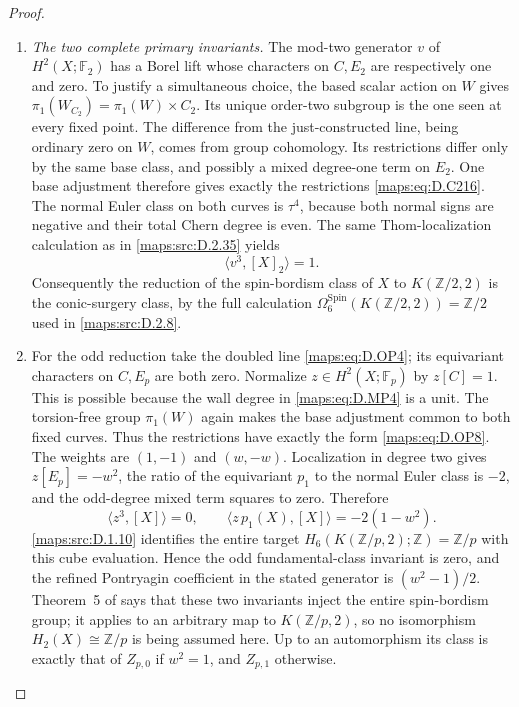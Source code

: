 \begin{proof}
\begin{enumerate}[label=\arabic*.,leftmargin=*]
\item \emph{The two complete primary invariants.}
The mod-two generator $v$ of $H^2(X;\mathbb F_2)$ has a Borel
lift whose characters on $C,E_2$ are respectively one and zero.
To justify a simultaneous choice, the based scalar action on
$W$ gives $\pi_1(W_{C_2})=\pi_1(W)\times C_2$. Its unique
order-two subgroup is the one seen at every fixed point.
The difference from the just-constructed line, being ordinary
zero on $W$, comes from group cohomology. Its restrictions
differ only by the same base class, and possibly a mixed
degree-one term on $E_2$. One base adjustment therefore gives
exactly the restrictions \eqref{maps:eq:D.C216}. The normal Euler class on
both curves is $\tau^4$, because both normal signs are negative
and their total Chern degree is even. The same Thom-localization
calculation as in \ref{maps:src:D.2.35} yields
\[
                         \langle v^3,[X]_2\rangle=1.     \tag{D.MP7}\label{maps:eq:D.MP7}
\]
Consequently the reduction of the spin-bordism class of $X$
to $K(\mathbb Z/2,2)$ is the conic-surgery class, by the full
calculation $\Omega^{\mathrm{Spin}}_6(K(\mathbb Z/2,2))
=\mathbb Z/2$ used in \ref{maps:src:D.2.8}.

\item For the odd reduction take the doubled line \eqref{maps:eq:D.OP4}; its
equivariant characters on $C,E_p$ are both zero. Normalize
$z\in H^2(X;\mathbb F_p)$ by $z[C]=1$. This is possible
because the wall degree in \eqref{maps:eq:D.MP4} is a unit. The torsion-free
group $\pi_1(W)$ again makes the base adjustment common to
both fixed curves. Thus the restrictions have exactly the
form \eqref{maps:eq:D.OP8}. The weights are $(1,-1)$ and $(w,-w)$.
Localization in degree two gives $z[E_p]=-w^2$, the ratio
of the equivariant $p_1$ to the normal Euler class is $-2$,
and the odd-degree mixed term squares to zero. Therefore
\[
 \langle z^3,[X]\rangle=0,\qquad
 \langle z\,p_1(X),[X]\rangle=-2(1-w^2).                 \tag{D.MP8}\label{maps:eq:D.MP8}
\]
\ref{maps:src:D.1.10} identifies the entire target
$H_6(K(\mathbb Z/p,2);\mathbb Z)=\mathbb Z/p$ with this cube
evaluation. Hence the odd fundamental-class invariant is zero,
and the refined Pontryagin coefficient in the stated generator
is $(w^2-1)/2$. Theorem~5 of \cite[p.796]{manZhubr75} says
that these two invariants inject the entire spin-bordism group;
it applies to an arbitrary map to $K(\mathbb Z/p,2)$, so no
isomorphism $H_2(X)\cong\mathbb Z/p$ is being assumed here.
Up to an automorphism its class is exactly that of
$Z_{p,0}$ if $w^2=1$, and $Z_{p,1}$ otherwise.


\end{enumerate}
\end{proof}
